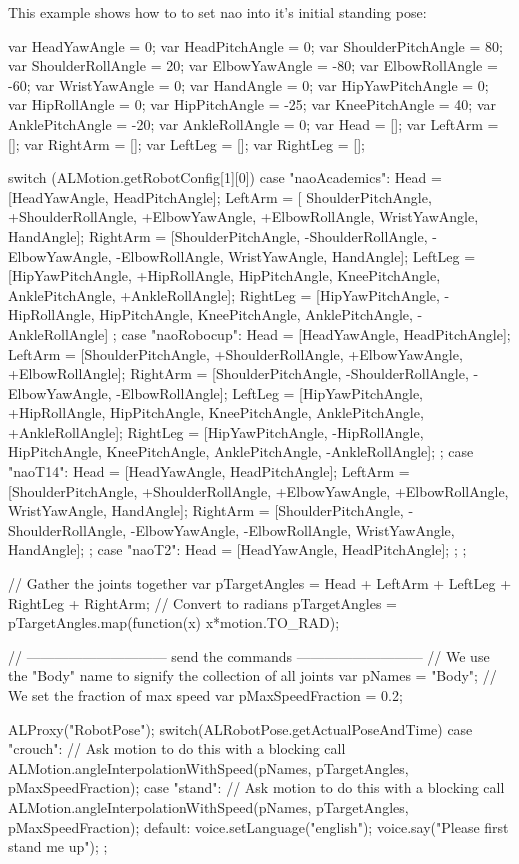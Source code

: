 This example shows how to to set nao into it's initial standing pose:

\begin{urbiunchecked}
var HeadYawAngle       = 0;
var HeadPitchAngle     = 0;
var ShoulderPitchAngle = 80;
var ShoulderRollAngle  = 20;
var ElbowYawAngle      = -80;
var ElbowRollAngle     = -60;
var WristYawAngle      = 0;
var HandAngle          = 0;
var HipYawPitchAngle   = 0;
var HipRollAngle       = 0;
var HipPitchAngle      = -25;
var KneePitchAngle     = 40;
var AnklePitchAngle    = -20;
var AnkleRollAngle     = 0;
var Head = [];
var LeftArm = [];
var RightArm = [];
var LeftLeg = [];
var RightLeg = [];

switch (ALMotion.getRobotConfig[1][0])
{
  case "naoAcademics":
  {
    Head     = [HeadYawAngle, HeadPitchAngle];
    LeftArm  = [ ShoulderPitchAngle, +ShoulderRollAngle,
      +ElbowYawAngle, +ElbowRollAngle, WristYawAngle, HandAngle];
    RightArm = [ShoulderPitchAngle, -ShoulderRollAngle,
      -ElbowYawAngle, -ElbowRollAngle, WristYawAngle, HandAngle];
    LeftLeg  = [HipYawPitchAngle, +HipRollAngle,
      HipPitchAngle, KneePitchAngle, AnklePitchAngle, +AnkleRollAngle];
    RightLeg = [HipYawPitchAngle, -HipRollAngle,
      HipPitchAngle, KneePitchAngle, AnklePitchAngle, -AnkleRollAngle]
  };
  case "naoRobocup":
  {
    Head     = [HeadYawAngle, HeadPitchAngle];
    LeftArm  = [ShoulderPitchAngle, +ShoulderRollAngle,
      +ElbowYawAngle, +ElbowRollAngle];
    RightArm = [ShoulderPitchAngle, -ShoulderRollAngle,
      -ElbowYawAngle, -ElbowRollAngle];
    LeftLeg  = [HipYawPitchAngle, +HipRollAngle,
      HipPitchAngle, KneePitchAngle, AnklePitchAngle, +AnkleRollAngle];
    RightLeg = [HipYawPitchAngle, -HipRollAngle,
      HipPitchAngle, KneePitchAngle, AnklePitchAngle, -AnkleRollAngle];
  };
  case "naoT14":
  {
    Head     = [HeadYawAngle, HeadPitchAngle];
    LeftArm  = [ShoulderPitchAngle, +ShoulderRollAngle,
      +ElbowYawAngle, +ElbowRollAngle, WristYawAngle, HandAngle];
    RightArm = [ShoulderPitchAngle, -ShoulderRollAngle,
      -ElbowYawAngle, -ElbowRollAngle, WristYawAngle, HandAngle];
  };
  case "naoT2":
  {
    Head     = [HeadYawAngle, HeadPitchAngle];
  };
};

// Gather the joints together
var pTargetAngles = Head + LeftArm + LeftLeg + RightLeg + RightArm;
// Convert to radians
pTargetAngles = pTargetAngles.map(function(x) {x*motion.TO_RAD});


// ------------------------------ send the commands ---------------------------
// We use the "Body" name to signify the collection of all joints
var pNames = "Body";
// We set the fraction of max speed
var pMaxSpeedFraction = 0.2;

ALProxy("RobotPose");
switch(ALRobotPose.getActualPoseAndTime)
{
  case "crouch":
    // Ask motion to do this with a blocking call
    ALMotion.angleInterpolationWithSpeed(pNames, pTargetAngles, pMaxSpeedFraction);
  case "stand":
    // Ask motion to do this with a blocking call
    ALMotion.angleInterpolationWithSpeed(pNames, pTargetAngles, pMaxSpeedFraction);
  default:
    voice.setLanguage("english");
    voice.say("Please first stand me up");
};
\end{urbiunchecked}

